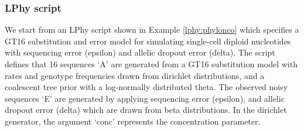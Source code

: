 \documentclass[10pt,letterpaper,table]{article}
\theoremstyle{definition}
\begin{document}
\subsubsection*{LPhy script}
We start from an LPhy script shown in Example \ref{lphy:phylonco} which specifies a GT16 substitution and error model \cite{kozlov2022cellphy} for simulating single-cell diploid nucleotides with sequencing error (epsilon) and allelic dropout error (delta).
The script defines that 16 sequences `A' are generated from a GT16 substitution model with rates and genotype frequencies drawn from dirichlet distributions, and a coalescent tree prior with a log-normally distributed theta.
The observed noisy sequences `E' are generated by applying sequencing error (epsilon), and allelic dropout error (delta) which are drawn from beta distributions. 
In the dirichlet generator, the argument `conc' represents the concentration parameter. 
\end{document}
